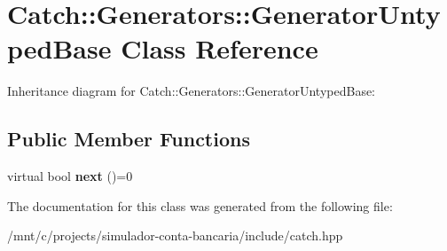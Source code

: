 \hypertarget{classCatch_1_1Generators_1_1GeneratorUntypedBase}{}\section{Catch\+:\+:Generators\+:\+:Generator\+Untyped\+Base Class Reference}
\label{classCatch_1_1Generators_1_1GeneratorUntypedBase}


Inheritance diagram for Catch\+:\+:Generators\+:\+:Generator\+Untyped\+Base\+:
\subsection*{Public Member Functions}
\begin{DoxyCompactItemize}
\item 
\mbox{\label{classCatch_1_1Generators_1_1GeneratorUntypedBase_aeed3c0cd6233c5f553549e453b8d6638}} 
virtual bool {\bfseries next} ()=0
\end{DoxyCompactItemize}


The documentation for this class was generated from the following file\+:\begin{DoxyCompactItemize}
\item 
/mnt/c/projects/simulador-\/conta-\/bancaria/include/catch.\+hpp\end{DoxyCompactItemize}
